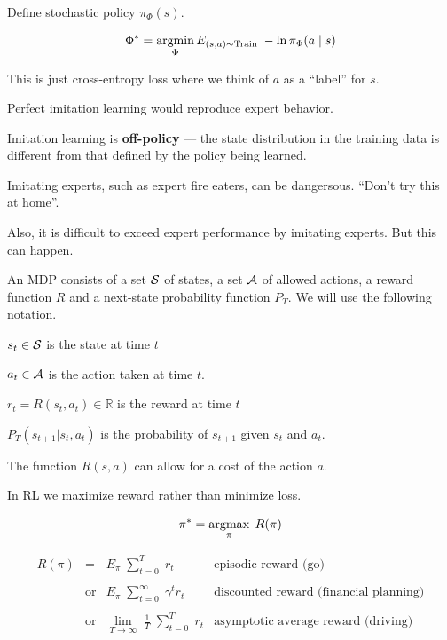 {\vfill
Define stochastic policy $\pi_\Phi(s)$.

\vfill
$$\Phi^* = \operatorname*{argmin}_\Phi E_{(s,a) \sim \mathrm{Train}}\;- \ln \pi_\Phi(a\;|\;s)$$

\vfill
This is just cross-entropy loss where we think of $a$ as a ``label'' for $s$.


Perfect imitation learning would reproduce expert behavior.

Imitation learning is {\bf off-policy} ---
the state distribution in the training data is different from that defined by the policy being learned.

\vfill
Imitating experts, such as expert fire eaters, can be dangersous.  ``Don't try this at home''.

\vfill
Also, it is difficult to exceed expert performance by imitating experts.  But this can happen.


An MDP consists of a set ${\cal S}$ of states, a set ${\cal A}$ of allowed actions, a reward function $R$
and a next-state probability function $P_T$.  We will use the following notation.

\vfill
$s_t \in {\cal S}$ is the state at time $t$

\vfill
$a_t \in {\cal A}$ is the action taken at time $t$.

\vfill
$r_t = R(s_t,a_t) \in \mathbb{R}$ is the reward at time $t$

\vfill
$P_T(s_{t+1}|s_t,a_t)$ is the probability of $s_{t+1}$ given $s_t$ and $a_t$.

\vfill
The function $R(s,a)$ can allow for a cost of the action $a$.


In RL we maximize reward rather than minimize loss.

$$\pi^* = \operatorname*{argmax}_\pi \;R(\pi)$$

\vfill
$$\begin{array}{rcll}
  R(\pi) & = & E_\pi\;\sum_{t=0}^T \;r_t &\mbox{episodic reward (go)} \\
\\
& \mbox{or} & E_\pi\;\sum_{t=0}^\infty \;\gamma^t r_t &\mbox{discounted reward (financial planning)} \\
\\
& \mbox{or} & \lim_{T \rightarrow \infty}\;\frac{1}{T} \;\sum_{t=0}^T \;r_t &\mbox{asymptotic average reward (driving)}
\end{array}$$


}
